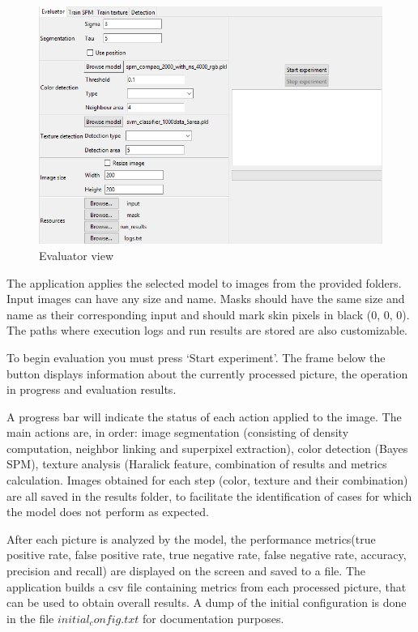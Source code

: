\documentclass[12pt]{report}
\begin{document}
	\begin{figure}[h!]
		\centering
		\includegraphics[width=\linewidth]{manual/evaluator_view.png}
		\caption{Evaluator view}
	\end{figure}
	
	The application applies the selected model to images from the provided folders. Input images can have any size and name. Masks should have the same size and name as their corresponding input and should mark skin pixels in black (0, 0, 0). The paths where execution logs and run results are stored are also customizable.
	
	To begin evaluation you must press ‘Start experiment’. The frame below the button displays information about the currently processed picture, the operation in progress and evaluation results. 
	
	A progress bar will indicate the status of each action applied to the image. The main actions are, in order: image segmentation (consisting of density computation, neighbor linking and superpixel extraction), color detection (Bayes SPM), texture analysis (Haralick feature, combination of results and metrics calculation. Images obtained for each step (color, texture and their combination) are all saved in the results folder, to facilitate the identification of cases for which the model does not perform as expected.
	
	After each picture is analyzed by the model, the performance metrics(true positive rate, false positive rate, true negative rate, false negative rate, accuracy, precision and recall) are displayed on the screen and saved to a file.
	The application builds a csv file containing metrics from each processed picture, that can be used to obtain overall results. A dump of the initial configuration is done in the file $initial_config.txt$ for documentation purposes.
	
\end{document}
